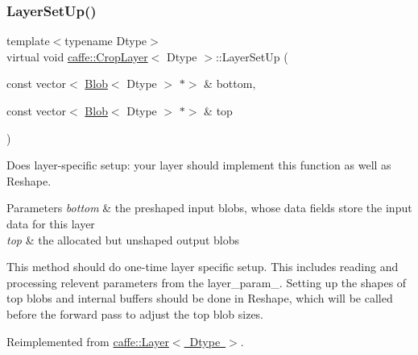 \subsubsection{\texorpdfstring{Layer\+Set\+Up()}{LayerSetUp()}\hspace{0.1cm}{\footnotesize\ttfamily [2/2]}}
{\footnotesize\ttfamily template$<$typename Dtype$>$ \\
virtual void \mbox{\hyperlink{classcaffe_1_1_crop_layer}{caffe\+::\+Crop\+Layer}}$<$ Dtype $>$\+::Layer\+Set\+Up (\begin{DoxyParamCaption}\item[{const vector$<$ \mbox{\hyperlink{classcaffe_1_1_blob}{Blob}}$<$ Dtype $>$ $\ast$$>$ \&}]{bottom,  }\item[{const vector$<$ \mbox{\hyperlink{classcaffe_1_1_blob}{Blob}}$<$ Dtype $>$ $\ast$$>$ \&}]{top }\end{DoxyParamCaption})\hspace{0.3cm}{\ttfamily [virtual]}}



Does layer-\/specific setup\+: your layer should implement this function as well as Reshape. 


\begin{DoxyParams}{Parameters}
{\em bottom} & the preshaped input blobs, whose data fields store the input data for this layer \\
\hline
{\em top} & the allocated but unshaped output blobs\\
\hline
\end{DoxyParams}
This method should do one-\/time layer specific setup. This includes reading and processing relevent parameters from the {\ttfamily layer\+\_\+param\+\_\+}. Setting up the shapes of top blobs and internal buffers should be done in {\ttfamily Reshape}, which will be called before the forward pass to adjust the top blob sizes. 

Reimplemented from \mbox{\hyperlink{classcaffe_1_1_layer_a481323a3e0972c682787f2137468c29f}{caffe\+::\+Layer$<$ Dtype $>$}}.

\mbox{\label{classcaffe_1_1_crop_layer_a71fca33b7fb554973d6e7cc39affd8da}} 
